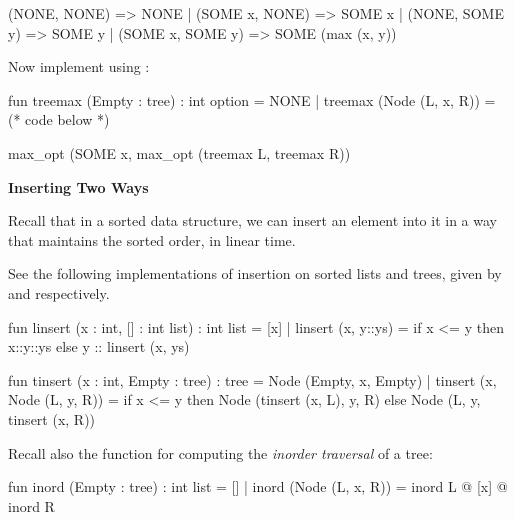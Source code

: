 \documentclass[addpoints,12pt]{exam}
\begin{document}
\begin{questions}
\begin{parts}
  \begin{solutionorbox}[15em]
    \begin{codeblock}
          (NONE, NONE) => NONE
        | (SOME x, NONE) => SOME x
        | (NONE, SOME y) => SOME y
        | (SOME x, SOME y) => SOME (max (x, y))
    \end{codeblock}
  \end{solutionorbox}

  Now implement  using :

  \begin{codeblock}
    fun treemax (Empty : tree) : int option = NONE
      | treemax (Node (L, x, R)) =
          (* code below *)
  \end{codeblock}

  \begin{solutionorbox}[10em]
    \begin{codeblock}
          max_opt (SOME x, max_opt (treemax L, treemax R))
    \end{codeblock}
  \end{solutionorbox}
\end{parts}

\newpage
{}

\textbf{Inserting Two Ways}

Recall that in a sorted data structure, we can insert an element into
it in a way that maintains the sorted order, in linear time.

See the following implementations of insertion on sorted lists and trees,
given by  and  respectively.

\begin{codeblock}
  fun linsert (x : int, [] : int list) : int list = [x]
    | linsert (x, y::ys) =
        if x <= y then
          x::y::ys
        else
          y :: linsert (x, ys)
\end{codeblock}

\begin{codeblock}
  fun tinsert (x : int, Empty : tree) : tree =
        Node (Empty, x, Empty)
    | tinsert (x, Node (L, y, R)) =
        if x <= y then
          Node (tinsert (x, L), y, R)
        else
          Node (L, y, tinsert (x, R))
\end{codeblock}

Recall also the function for computing the \emph{inorder traversal} of
a tree:
\begin{codeblock}
  fun inord (Empty : tree) : int list = []
    | inord (Node (L, x, R)) = inord L @ [x] @ inord R
\end{codeblock}


\end{questions}
\end{document}
